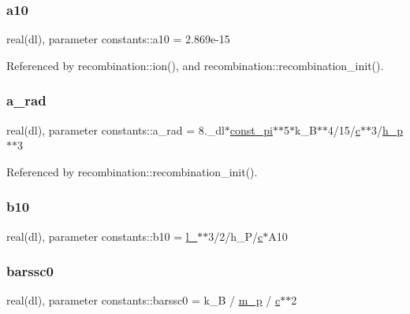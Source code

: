 \subsubsection{\texorpdfstring{a10}{a10}}
{\footnotesize\ttfamily real(dl), parameter constants\+::a10 = 2.\+869e-\/15}



Referenced by recombination\+::ion(), and recombination\+::recombination\+\_\+init().

\mbox{\label{namespaceconstants_a8930b886e85c5c95942db45cb3485fbe}} 
\subsubsection{\texorpdfstring{a\+\_\+rad}{a\_rad}}
{\footnotesize\ttfamily real(dl), parameter constants\+::a\+\_\+rad = 8.\+\_\+dl$\ast$\mbox{\hyperlink{namespaceconstants_ae6b5af15d3fb28a3dba468486c548447}{const\+\_\+pi}}$\ast$$\ast$5$\ast$k\+\_\+B$\ast$$\ast$4/15/\mbox{\hyperlink{namespaceconstants_acf9c352e48b37fa8a9aff3e5957246b8}{c}}$\ast$$\ast$3/\mbox{\hyperlink{namespaceconstants_a3bfcfec5bb3ae395c9384035afa3ff0b}{h\+\_\+p}}$\ast$$\ast$3}



Referenced by recombination\+::recombination\+\_\+init().

\mbox{\label{namespaceconstants_a5d09e5a51fe5111f2d4d80309a6cecc1}} 
\subsubsection{\texorpdfstring{b10}{b10}}
{\footnotesize\ttfamily real(dl), parameter constants\+::b10 = \mbox{\hyperlink{namespaceconstants_af1bb81b6c283a010f3e86c321579edb0}{l\+\_\+21cm}}$\ast$$\ast$3/2/h\+\_\+P/\mbox{\hyperlink{namespaceconstants_acf9c352e48b37fa8a9aff3e5957246b8}{c}}$\ast$A10}

\mbox{\label{namespaceconstants_a849ef8cb73f59304fa5e01297f4d040d}} 
\subsubsection{\texorpdfstring{barssc0}{barssc0}}
{\footnotesize\ttfamily real(dl), parameter constants\+::barssc0 = k\+\_\+B / \mbox{\hyperlink{namespaceconstants_af32db00e3c1473bdccb379fea19b3921}{m\+\_\+p}} / \mbox{\hyperlink{namespaceconstants_acf9c352e48b37fa8a9aff3e5957246b8}{c}}$\ast$$\ast$2}



